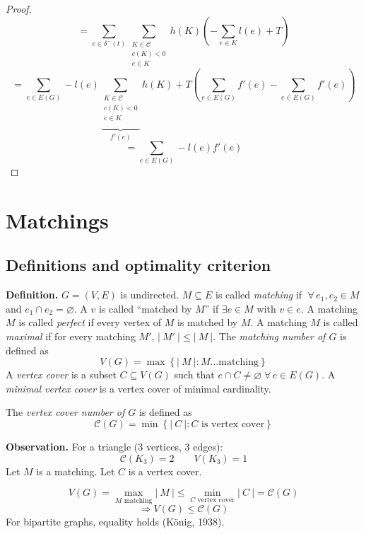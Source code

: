 \documentclass{article}
\newcommand{\card}[1]{\left|\:\!#1\:\!\right|}
\newcommand{\set}[1]{\left\{#1\right\}}
\newcommand{\fall}{\;\forall\,}
\begin{document}
\begin{proof}
\begin{equation*}
      = \sum_{e \in \delta^-(t)} \sum_{\substack{K \in \mathcal{C} \\ c(K) < 0 \\ e \in K}} h(K) \left(
        -\sum_{e \in K} l(e) + T
      \right)
  \end{equation*} \begin{equation*}
    = \sum_{e \in E(G)} -l(e) \underbrace{\sum_{\substack{K \in \mathcal{C} \\ c(K) < 0 \\ e \in K}}}_{f'(e)} h(K)
    + T \left(\sum_{e \in E(G)} f'(e) - \sum_{e \in E(G)} f'(e)\right)
  \end{equation*} \begin{equation*}
    = \sum_{e \in E(G)} -l(e) f'(e)
  \end{equation*}
\end{proof}

\section{Matchings}
%
\subsection{Definitions and optimality criterion}
%
\textbf{Definition.}
  $G=(V,E)$ is undirected. $M \subseteq E$ is called \emph{matching} if $\fall e_1, e_2 \in M$ and $e_1 \cap e_2 = \diameter$. A $v$ is called ``matched by $M$'' if $\exists e \in M$ with $v \in e$. A matching $M$ is called \emph{perfect} if every vertex of $M$ is matched by $M$. A matching $M$ is called \emph{maximal} if for every matching $M'$, $\card{M'} \leq \card{M}$. The \emph{matching number of $G$} is defined as
  \[ V(G) = \max\set{\card{M}: M \dots \text{matching}} \]
  A \emph{vertex cover} is a subset $C \subseteq V(G)$ such that $e \cap C \neq \diameter \fall e \in E(G)$.
  A \emph{minimal vertex cover} is a vertex cover of minimal cardinality.

  The \emph{vertex cover number of $G$} is defined as
  \[ \mathcal{C}(G) = \min\set{\card{C}: C \text{ is vertex cover}} \]

\textbf{Observation.}
  For a triangle (3 vertices, 3 edges):
  \[ \mathcal{C}(K_3) = 2 \qquad V(K_3) = 1 \]
  Let $M$ is a matching. Let $C$ is a vertex cover.

  \[
    V(G)
      =
        \max_{\text{$M$ matching}} \card{M} \leq \min_{\text{$C$ vertex cover}} \card{C}
      =
    \mathcal{C}(G)
  \] \[
    \Rightarrow V(G) \leq \mathcal{C}(G)
  \]
  For bipartite graphs, equality holds (König, 1938).
\end{document}
